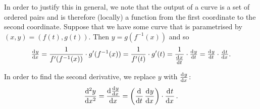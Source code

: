 In order to justify this in general, we note that the output of a curve is a set of ordered pairs and is therefore (locally) a function from the
first coordinate to the second coordinate. Suppose that we have some curve that is parametrised by $ (x,y) = (f(t), g(t)) $. Then $ y = g(f^{-1}(x)) $ and so
\begin{displaymath}
  \od{y}{x} = \frac{1}{f'(f^{-1}(x))} \cdot g'(f^{-1}(x)) = \frac{1}{f'(t)} \cdot g'(t) = \frac{1}{\od{x}{t}} \cdot \od{y}{t} = \od{y}{t} \cdot \od{t}{x}.
\end{displaymath}

In order to find the second derivative, we replace $ y $ with $ \od{y}{x} $:
\begin{displaymath}
  \dod[2]{y}{x} = \dod{\od{y}{x}}{x} = \left(\dod{}{t} \dod{y}{x}\right) \cdot \dod{t}{x}.
\end{displaymath}

\clearpage
